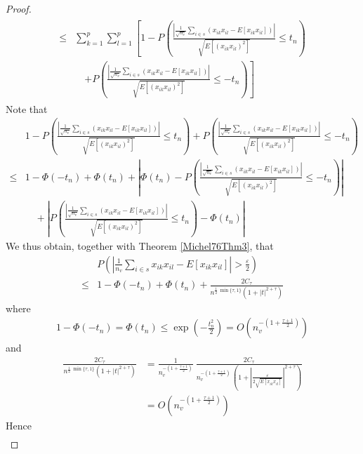 \documentclass[Research_Module_ES.tex]{subfiles}
\begin{document}
\begin{proof}
\begin{align}
\begin{split}\label{dreieck}
\leq&\sum_{k=1}^{p}\sum_{l=1}^{p}\left[ 1-P\left( \frac{\left|\frac{1}{\sqrt{n_v}}\sum_{i\in s}\left(x_{ik}x_{il}-E[x_{ik}x_{il}]\right)\right|}{\sqrt{E[(x_{ik}x_{il})^2]}}\leq t_n \right) \right.\\
&\quad\left. + P\left( \frac{\left|\frac{1}{\sqrt{n_v}}\sum_{i\in s}\left(x_{ik}x_{il}-E[x_{ik}x_{il}]\right)\right|}{\sqrt{E[(x_{ik}x_{il})^2]}}\leq -t_n \right) \right]
\end{split}
\end{align}
Note that
\begin{align*}
 &1-P\left( \frac{\left|\frac{1}{\sqrt{n_v}}\sum_{i\in s}\left(x_{ik}x_{il}-E[x_{ik}x_{il}]\right)\right|}{\sqrt{E[(x_{ik}x_{il})^2]}}\leq t_n \right) + P\left( \frac{\left|\frac{1}{\sqrt{n_v}}\sum_{i\in s}\left(x_{ik}x_{il}-E[x_{ik}x_{il}]\right)\right|}{\sqrt{E[(x_{ik}x_{il})^2]}}\leq -t_n \right) \\
 \leq&1-\Phi(-t_n)+\Phi(t_n)+\left| \Phi(t_n)-P\left( \frac{\left|\frac{1}{\sqrt{n_v}}\sum_{i\in s}\left(x_{ik}x_{il}-E[x_{ik}x_{il}]\right)\right|}{\sqrt{E[(x_{ik}x_{il})^2]}}\leq -t_n\right) \right|\\
 &\quad+ \left|P\left(\frac{\left|\frac{1}{\sqrt{n_v}}\sum_{i\in s}\left(x_{ik}x_{il}-E[x_{ik}x_{il}]\right)\right|}{\sqrt{E[(x_{ik}x_{il})^2]}} \leq t_n\right) -\Phi(t_n)\right|
\end{align*}
We thus obtain, together with Theorem \ref{Michel76Thm3}, that
\begin{align*}
&P\left(\left| \frac{1}{n_v}\sum_{i\in s}x_{ik}x_{il}-E[x_{ik} x_{il}] \right|>\frac{\varepsilon}{2}\right)\\
\leq&1-\Phi(-t_n)+\Phi(t_n)+\frac{2C_\tau}{n^{\frac{1}{2}~ \min\{\tau,1\}} (1+|t|^{2+\tau}) }
\end{align*}
where 
\begin{align*}
1-\Phi(-t_n)=\Phi(t_n)\leq\exp\left(-\frac{t_n^2}{2}\right)=O\left(n_v^{-\left(1+\frac{\tau+1}{2}\right)}\right)
\end{align*}
and
\begin{align*}
\frac{2C_\tau}{n^{\frac{1}{2}~ \min\{\tau,1\}} (1+|t|^{2+\tau}) }&=\frac{1}{n_v^{-\left(1+\frac{\tau+1}{2}\right)}}~\frac{2C_\tau}{n_v^{-\left( 1+\frac{\tau+1}{2} \right)} ~\left(1+\left|  \frac{\varepsilon}{2\sqrt{E[x_{ik}x_{il}]}} \right|^{2+\tau}\right)  }\\
&=O\left(  n_v^{-\left( 1+\frac{\tau+1}{2}  \right)} \right)
\end{align*}
Hence
\begin{align*}

\end{align*}
\end{proof}
\end{document}
